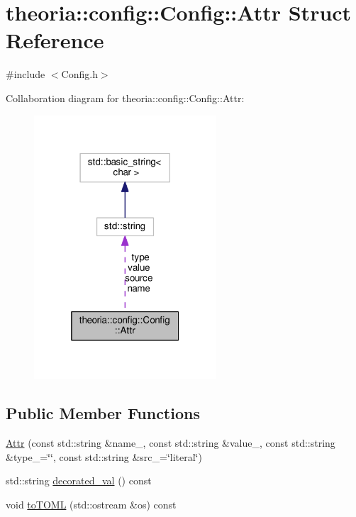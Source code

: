 \hypertarget{structtheoria_1_1config_1_1Config_1_1Attr}{}\section{theoria\+:\+:config\+:\+:Config\+:\+:Attr Struct Reference}
\label{structtheoria_1_1config_1_1Config_1_1Attr}


{\ttfamily \#include $<$Config.\+h$>$}



Collaboration diagram for theoria\+:\+:config\+:\+:Config\+:\+:Attr\+:\nopagebreak
\begin{figure}[H]
\begin{center}
\leavevmode
\includegraphics[width=193pt]{structtheoria_1_1config_1_1Config_1_1Attr__coll__graph}
\end{center}
\end{figure}
\subsection*{Public Member Functions}
\begin{DoxyCompactItemize}
\item 
\hyperlink{structtheoria_1_1config_1_1Config_1_1Attr_ab06451bb786404d66a1fce58229310f6}{Attr} (const std\+::string \&name\+\_\+, const std\+::string \&value\+\_\+, const std\+::string \&type\+\_\+=\char`\"{}\char`\"{}, const std\+::string \&src\+\_\+=\char`\"{}literal\char`\"{})
\item 
std\+::string \hyperlink{structtheoria_1_1config_1_1Config_1_1Attr_a9b962e373741badc6253b5aa01875252}{decorated\+\_\+val} () const
\item 
void \hyperlink{structtheoria_1_1config_1_1Config_1_1Attr_a2a9664369d7c716e454b942607febeb1}{to\+T\+O\+ML} (std\+::ostream \&os) const
\end{DoxyCompactItemize}
